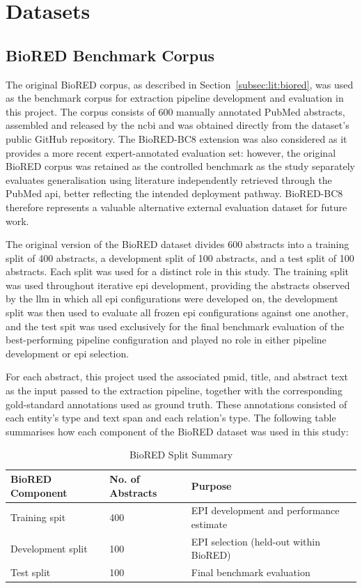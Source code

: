 \section{Datasets}
\label{sec:meth:datasets}

\subsection{BioRED Benchmark Corpus}
\label{subsec:meth:biored_benchmark_corpus}
The original BioRED corpus, as described in Section~\ref{subsec:lit:biored}, was used as the benchmark corpus for extraction pipeline development and evaluation in this project. The corpus consists of 600 manually annotated PubMed abstracts, assembled and released by the \gls{ncbi} and was obtained directly from the dataset's public GitHub repository. The BioRED-BC8 extension was also considered as it provides a more recent expert-annotated evaluation set: however, the original BioRED corpus was retained as the controlled benchmark as the study separately evaluates generalisation using literature independently retrieved through the PubMed \gls{api}, better reflecting the intended deployment pathway. BioRED-BC8 therefore represents a valuable alternative external evaluation dataset for future work.

The original version of the BioRED dataset divides 600 abstracts into a training split of 400 abstracts, a development split of 100 abstracts, and a test split of 100 abstracts. Each split was used for a distinct role in this study. The training split was used throughout iterative \gls{epi} development, providing the abstracts observed by the \gls{llm} in which all \gls{epi} configurations were developed on, the development split was then used to evaluate all frozen \gls{epi} configurations against one another, and the test spit was used exclusively for the final benchmark evaluation of the best-performing pipeline configuration and played no role in either pipeline development or \gls{epi} selection.

For each abstract, this project used the associated \gls{pmid}, title, and abstract text as the input passed to the extraction pipeline, together with the corresponding gold-standard annotations used as ground truth. These annotations consisted of each entity's type and text span and each relation's type. The following table summarises how each component of the BioRED dataset was used in this study:

\begin{table}[H]
    \centering
    \caption{BioRED Split Summary}
    \label{tab:biored_split_summary}
    \begin{tabularx}{\textwidth}{l Y Y Y}
        \toprule
        BioRED Component & No. of Abstracts & Purpose \\
        \midrule
        Training spit & 400 & EPI development and performance estimate \\
        Development split & 100 & EPI selection (held-out within BioRED) \\
        Test split & 100 & Final benchmark evaluation \\
        \bottomrule
    \end{tabularx}
\end{table}

